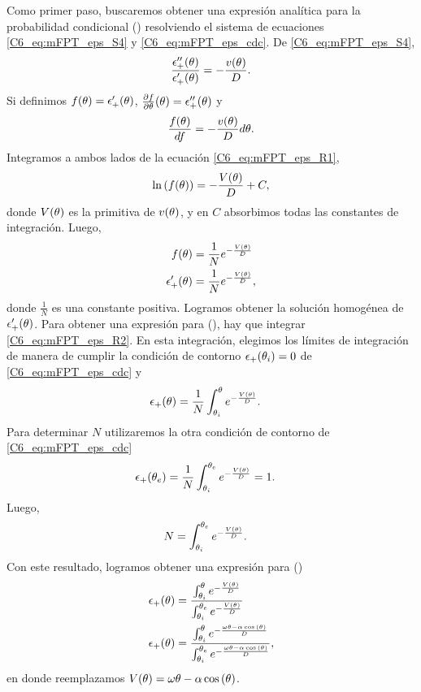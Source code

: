 \documentclass[./main.tex]{subfiles}
\begin{document}
Como primer paso, buscaremos obtener una expresión analítica para la probabilidad condicional \epsplus(\xx) resolviendo el sistema de ecuaciones \ref{C6_eq:mFPT_eps_S4} y \ref{C6_eq:mFPT_eps_cdc}. De \ref{C6_eq:mFPT_eps_S4},
\begin{align}
     \frac{\epsilon_{+}''(\theta)}{\epsilon_{+}'(\theta)} = - \frac{v(\theta)}{D}.
\end{align}
Si definimos $f(\theta) = \epsilon_{+}'(\theta)$, $\frac{\partial f}{\partial\theta}(\theta) = \epsilon_{+}''(\theta) $ y
\begin{align}
     \frac{f(\theta)}{df} = - \frac{v(\theta)}{D} d\theta.
     \label{C6_eq:mFPT_eps_R1}
\end{align}
Integramos a ambos lados de la ecuación \ref{C6_eq:mFPT_eps_R1}, 
\begin{align}
     \ln{(f(\ensuremath{\theta}))} = - \frac{V(\theta)}{D} + C,
\end{align}
donde $V(\theta)$ es la primitiva de $v(\theta)$, y en $C$ absorbimos todas las constantes de integración. Luego,
\begin{align}
     f(\theta) &= \frac{1}{N} e^{- \frac{V(\theta)}{D}} \\
     \epsilon_{+}'(\theta) & =\frac{1}{N} e^{- \frac{V(\theta)}{D}}, 
     \label{C6_eq:mFPT_eps_R2}
\end{align}
donde $\frac{1}{N}$ es una constante positiva. Logramos obtener la solución homogénea de $\epsilon_{+}'(\theta)$. Para obtener una expresión para \epsplus(\xx), hay que integrar \ref{C6_eq:mFPT_eps_R2}. En esta integración, elegimos los límites de integración de manera de cumplir la condición de contorno $\epsilon_{+}(\theta_i) = 0 $ de \ref{C6_eq:mFPT_eps_cdc} y
\begin{align}
     \epsilon_{+}(\theta) & = \frac{1}{N} \int_{\theta_i}^\theta e^{- \frac{V(\theta)}{D}} .
\end{align}
Para determinar $N$ utilizaremos la otra condición de contorno de \ref{C6_eq:mFPT_eps_cdc}
\begin{align}
     \epsilon_{+}(\theta_e) & = \frac{1}{N} \int_{\theta_i}^{\theta_e} e^{- \frac{V(\theta)}{D}} = 1. 
\end{align}
Luego,
\begin{align}
      N &= \int_{\theta_i}^{\theta_e} e^{- \frac{V(\theta)}{D}} . 
\end{align}
Con este resultado, logramos obtener una expresión para \epsplus(\xx) 
\begin{align}
     \epsilon_{+}(\theta) & = \frac{\int_{\theta_i}^\theta e^{- \frac{V(\theta)}{D}}}{\int_{\theta_i}^{\theta_e} e^{- \frac{V(\theta)}{D}}} \\
     \epsilon_{+}(\theta) & = \frac{\int_{\theta_i}^\theta e^{- \frac{\omega \theta - \alpha \cos{(\ensuremath{\theta})}}{D}}}{\int_{\theta_i}^{\theta_e} e^{- \frac{\omega \theta - \alpha \cos{(\ensuremath{\theta})}}{D}}},
     \label{C6_eq:mFPT_eps_res}
\end{align}
en donde reemplazamos $V(\theta) = \omega \theta - \alpha \cos{(\ensuremath{\theta})}$.
\end{document}
